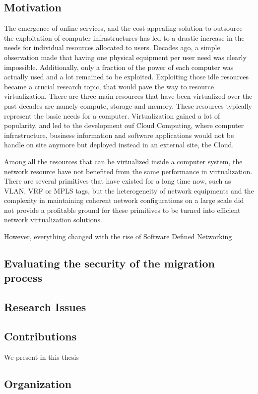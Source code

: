 \subsection{Motivation}

The emergence of online services, and the cost-appealing solution to outsource the exploitation of computer infrastructures has led to a drastic increase in the needs for individual resources allocated to users. Decades ago, a simple observation made that having one physical equipment per user need was clearly impossible. Additionally, only a fraction of the power of each computer was actually used and a lot remained to be exploited.
Exploiting those idle resources became a crucial research topic, that would pave the way to resource virtualization. There are three main resources that have been virtualized over the past decades are namely compute, storage and memory.
These resources typically represent the basic needs for a computer.
Virtualization gained a lot of popularity, and led to the development ouf Cloud Computing, where computer infrastructure, business information and software applications would not be handle on site anymore but deployed instead in an external site, \ie the Cloud.

Among all the resources that can be virtualized inside a computer system, the network resource have not benefited from the same performance in virtualization.
There are several primitives that have existed for a long time now, such as VLAN, VRF or MPLS tags, but the heterogeneity of network equipments and the complexity in maintaining coherent network configurations on a large scale did not provide a profitable ground for these primitives to be turned into efficient network virtualization solutions.

However, everything changed with the rise of Software Defined Networking


\subsection{Evaluating the security of the migration process}

\subsection{Research Issues}

\subsection{Contributions}
We present in this thesis  


\subsection{Organization}